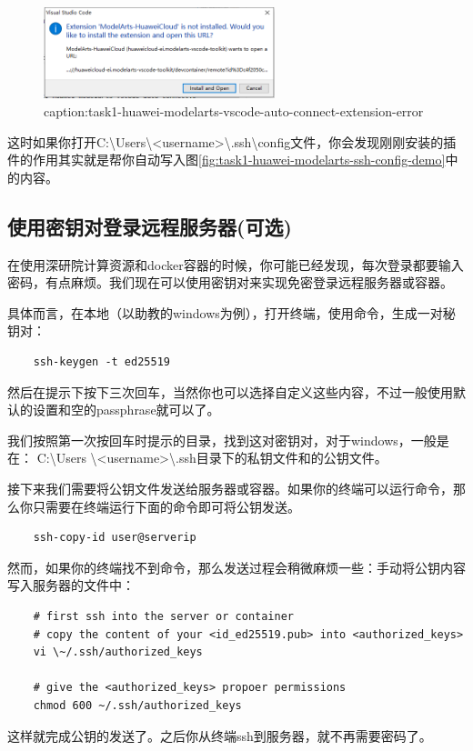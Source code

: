 \begin{figure}[htbp]
	\centering
	\includegraphics[width=0.6\textwidth]{figures/task1-huawei-modelarts-vscode-auto-connect-extension-error.png}
	\caption{caption:task1-huawei-modelarts-vscode-auto-connect-extension-error}
	\label{fig:task1-huawei-modelarts-vscode-auto-connect-extension-error}
\end{figure}

这时如果你打开C:\textbackslash Users\textbackslash <username>\textbackslash .ssh\textbackslash config文件，你会发现刚刚安装的插件的作用其实就是帮你自动写入图\ref{fig:task1-huawei-modelarts-ssh-config-demo}中的内容。


\subsection{使用密钥对登录远程服务器(可选)}

在使用深研院计算资源和docker容器的时候，你可能已经发现，每次登录都要输入密码，有点麻烦。我们现在可以使用密钥对来实现免密登录远程服务器或容器。

具体而言，在本地（以助教的windows为例），打开终端，使用命令，生成一对秘钥对：
\begin{lstlisting}
    ssh-keygen -t ed25519
\end{lstlisting}
然后在提示下按下三次回车，当然你也可以选择自定义这些内容，不过一般使用默认的设置和空的passphrase就可以了。


我们按照第一次按回车时提示的目录，找到这对密钥对，对于windows，一般是在：
C:\textbackslash Users \textbackslash <username>\textbackslash .ssh目录下的私钥文件和的公钥文件。

接下来我们需要将公钥文件发送给服务器或容器。如果你的终端可以运行命令，那么你只需要在终端运行下面的命令即可将公钥发送。
\begin{lstlisting}
    ssh-copy-id user@serverip
\end{lstlisting}

然而，如果你的终端找不到命令，那么发送过程会稍微麻烦一些：手动将公钥内容写入服务器的文件中：
\begin{lstlisting}
    # first ssh into the server or container
    # copy the content of your <id_ed25519.pub> into <authorized_keys>
    vi \~/.ssh/authorized_keys
    
    # give the <authorized_keys> propoer permissions
    chmod 600 ~/.ssh/authorized_keys    
\end{lstlisting}
这样就完成公钥的发送了。之后你从终端ssh到服务器，就不再需要密码了。


